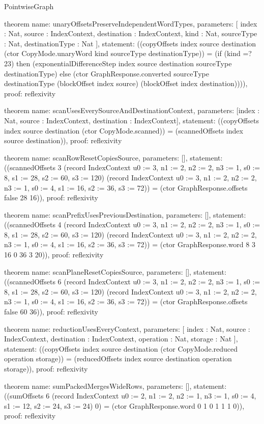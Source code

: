\begin{lexlean}{PointwiseGraph}
\begin{semanticmodule}
theorem{
  name: unaryOffsetsPreserveIndependentWordTypes,
  parameters: [
    index : Nat,
    source : IndexContext,
    destination : IndexContext,
    kind : Nat,
    sourceType : Nat,
    destinationType : Nat
  ],
  statement: ((copyOffsets index source destination (ctor CopyMode.unaryWord kind sourceType destinationType)) = (if (kind =? 23) then (exponentialDifferenceStep index source destination sourceType destinationType) else (ctor GraphResponse.converted sourceType destinationType (blockOffset index source) (blockOffset index destination)))),
  proof: reflexivity{}
}

theorem{
  name: scanUsesEverySourceAndDestinationContext,
  parameters: [index : Nat, source : IndexContext, destination : IndexContext],
  statement: ((copyOffsets index source destination (ctor CopyMode.scanned)) = (scannedOffsets index source destination)),
  proof: reflexivity{}
}

theorem{
  name: scanRowResetCopiesSource,
  parameters: [],
  statement: ((scannedOffsets 3 (record IndexContext {u0 := 3, n1 := 2, n2 := 2, n3 := 1, s0 := 8, s1 := 28, s2 := 60, s3 := 120}) (record IndexContext {u0 := 3, n1 := 2, n2 := 2, n3 := 1, s0 := 4, s1 := 16, s2 := 36, s3 := 72})) = (ctor GraphResponse.offsets false 28 16)),
  proof: reflexivity{}
}

theorem{
  name: scanPrefixUsesPreviousDestination,
  parameters: [],
  statement: ((scannedOffsets 4 (record IndexContext {u0 := 3, n1 := 2, n2 := 2, n3 := 1, s0 := 8, s1 := 28, s2 := 60, s3 := 120}) (record IndexContext {u0 := 3, n1 := 2, n2 := 2, n3 := 1, s0 := 4, s1 := 16, s2 := 36, s3 := 72})) = (ctor GraphResponse.word 8 3 16 0 36 3 20)),
  proof: reflexivity{}
}

theorem{
  name: scanPlaneResetCopiesSource,
  parameters: [],
  statement: ((scannedOffsets 6 (record IndexContext {u0 := 3, n1 := 2, n2 := 2, n3 := 1, s0 := 8, s1 := 28, s2 := 60, s3 := 120}) (record IndexContext {u0 := 3, n1 := 2, n2 := 2, n3 := 1, s0 := 4, s1 := 16, s2 := 36, s3 := 72})) = (ctor GraphResponse.offsets false 60 36)),
  proof: reflexivity{}
}

theorem{
  name: reductionUsesEveryContext,
  parameters: [
    index : Nat,
    source : IndexContext,
    destination : IndexContext,
    operation : Nat,
    storage : Nat
  ],
  statement: ((copyOffsets index source destination (ctor CopyMode.reduced operation storage)) = (reducedOffsets index source destination operation storage)),
  proof: reflexivity{}
}

theorem{
  name: sumPackedMergesWideRows,
  parameters: [],
  statement: ((sumOffsets 6 (record IndexContext {u0 := 2, n1 := 2, n2 := 1, n3 := 1, s0 := 4, s1 := 12, s2 := 24, s3 := 24}) 0) = (ctor GraphResponse.word 0 1 0 1 1 1 0)),
  proof: reflexivity{}
}


\end{semanticmodule}
\end{lexlean}
